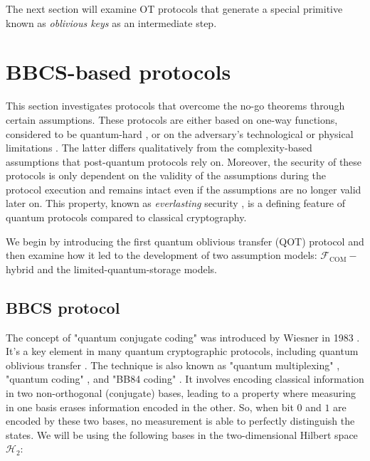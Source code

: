 The next section will examine OT protocols that generate a special primitive known as \textit{oblivious keys} as an intermediate step.



\section{BBCS-based protocols}

This section investigates protocols that overcome the no-go theorems \cite{LC97, M97} through certain assumptions. These protocols are either based on one-way functions, considered to be quantum-hard \cite{BCKM21, GLSV21, A02}, or on the adversary's technological or physical limitations \cite{DFSS05, WST08, KWW12, L14, Pit16, Ken11}. The latter differs qualitatively from the complexity-based assumptions that post-quantum protocols rely on. Moreover, the security of these protocols is only dependent on the validity of the assumptions during the protocol execution and remains intact even if the assumptions are no longer valid later on. This property, known as \textit{everlasting} security \cite{U18}, is a defining feature of quantum protocols compared to classical cryptography.

We begin by introducing the first quantum oblivious transfer (QOT) protocol and then examine how it led to the development of two assumption models: $\mathcal{F}_{\text{COM}}-$hybrid and the limited-quantum-storage models.

\subsection{BBCS protocol}\label{sec:BBCS}

The concept of "quantum conjugate coding" was introduced by Wiesner in 1983 \cite{W83}. It's a key element in many quantum cryptographic protocols, including quantum oblivious transfer \cite{BBCS92}. The technique is also known as "quantum multiplexing" \cite{BBBW83}, "quantum coding" \cite{BBB14}, and "BB84 coding" \cite{S99}. It involves encoding classical information in two non-orthogonal (conjugate) bases, leading to a property where measuring in one basis erases information encoded in the other. So, when bit $0$ and $1$ are encoded by these two bases, no measurement is able to perfectly distinguish the states. We will be using the following bases in the two-dimensional Hilbert space $\mathcal{H}_2$:

